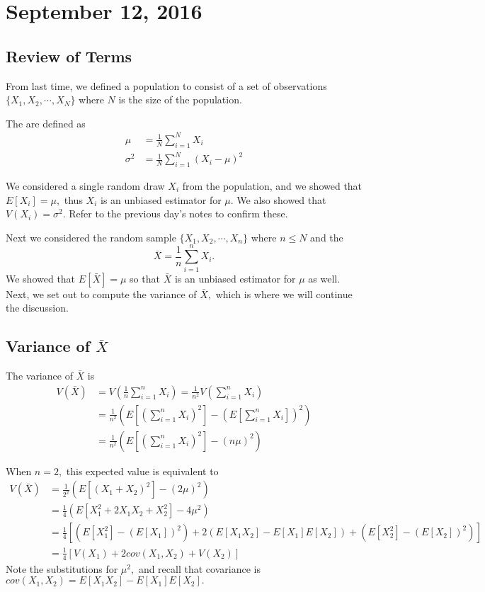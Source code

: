 \documentclass{article}
\begin{document}
\newpage

\section{September 12, 2016}
\subsection{Review of Terms}

From last time, we defined a population to consist of a set of observations $\{X_1, X_2, \cdots, X_N\}$ where $N$ is the size of the population.

The  are defined as
\begin{align*}
	\mu &= \frac{1}{N}\sum_{i=1}^N X_i \\
	\sigma^2 &= \frac{1}{N}\sum_{i=1}^N (X_i-\mu)^2
\end{align*}

We considered a single random draw $X_i$ from the population, and we showed that $E[X_i]=\mu,$ thus $X_i$ is an unbiased estimator for $\mu.$ We also showed that $V(X_i)=\sigma^2.$ Refer to the previous day's notes to confirm these.

Next we considered the random sample $\{X_1, X_2, \cdots, X_n\}$ where $n\le N$ and the  \[\bar{X}=\frac{1}{n}\sum_{i=1}^n X_i. \] We showed that $E[\bar{X}] = \mu$ so that $\bar{X}$ is an unbiased estimator for $\mu$ as well. Next, we set out to compute the variance of $\bar{X},$ which is where we will continue the discussion.

\subsection{Variance of $\bar{X}$}
The variance of $\bar{X}$ is 
\begin{align*}
	V(\bar{X}) &= V\left( \frac{1}{n}\sum_{i=1}^n X_i \right) = \frac{1}{n^2}V\left( \sum_{i=1}^n X_i \right) \\
	&= \frac{1}{n^2}\left( E\left[ \left( \sum_{i=1}^n X_i\right)^2 \right] - \left( E\left[ \sum_{i=1}^n X_i \right] \right)^2\right) \\
	&= \frac{1}{n^2} \left( E\left[ \left( \sum_{i=1}^n X_i \right)^2 \right] - (n\mu)^2 \right)
\end{align*}

\begin{example}[$n=2$]
	When $n=2,$ this expected value is equivalent to 
	\begin{align*}
		V(\bar{X}) &= \frac{1}{2^2} (E[(X_1+X_2)^2]-(2\mu)^2) \\
		&= \frac{1}{4} (E[X_1^2+2X_1X_2+X_2^2]-4\mu^2) \\
		&= \frac{1}{4} \left[ (E[X_1^2]-(E[X_1])^2) + 2(E[X_1X_2]-E[X_1]E[X_2]) + (E[X_2^2]-(E[X_2])^2) \right] \\
		&= \frac{1}{4} \left[ V(X_1) + 2cov(X_1, X_2) + V(X_2) \right]
	\end{align*}
	Note the substitutions for $\mu^2,$ and recall that covariance is $cov(X_1, X_2)=E[X_1X_2]-E[X_1]E[X_2].$
\end{example}
\end{document}
